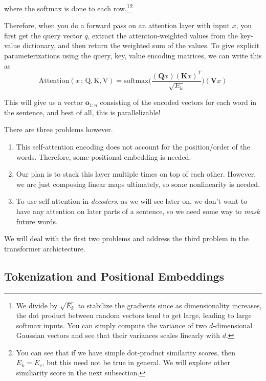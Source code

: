 \begin{definition}
      where the softmax is done to each row.\footnote{We divide by $\sqrt{E_k}$ to stabilize the gradients since as dimensionality increases, the dot product between random vectors tend to get large, leading to large softmax inputs. You can simply compute the variance of two $d$-dimensional Gaussian vectors and see that their variances scales linearly with $d$. }\footnote{You can see that if we have simple dot-product similarity scores, then $E_k = E_v$, but this need not be true in general. We will explore other similiarity score in the next subsection. } 

      Therefore, when you do a forward pass on an attention layer with input $x$, you first get the query vector $q$, extract the attention-weighted values from the key-value dictionary, and then return the weighted sum of the values. To give explicit parameterizations using the query, key, value encoding matrices, we can write this as 
      \begin{equation} 
        \mathrm{Attention}(x \,;\, \mathrm{Q}, \mathrm{K}, \mathrm{V}) = \mathrm{softmax} \bigg( \frac{(\mathbf{Q}x)(\mathbf{K} x)^T}{\sqrt{E_k}} \bigg) (\mathbf{V} x)
      \end{equation}

      This will give us a vector $\mathbf{o}_{1:n}$ consisting of the encoded vectors for each word in the sentence, and best of all, this is parallelizable! 
    \end{definition}

    There are three problems however. 
    \begin{enumerate}
      \item This self-attention encoding does not account for the position/order of the words. Therefore, some positional embedding is needed. 
      \item Our plan is to stack this layer multiple times on top of each other. However, we are just composing linear maps ultimately, so some nonlinearity is needed. 
      \item To use self-attention in \textit{decoders}, as we will see later on, we don't want to have any attention on later parts of a sentence, so we need some way to \textit{mask} future words. 
    \end{enumerate}

    We will deal with the first two problems and address the third problem in the transformer archictecture. 

\subsection{Tokenization and Positional Embeddings}

